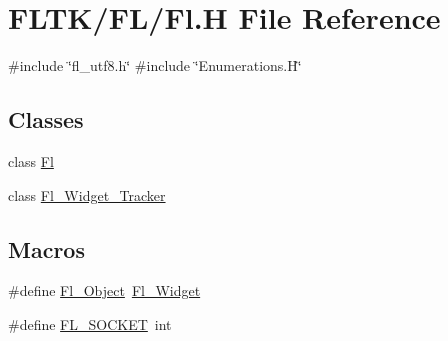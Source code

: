 \hypertarget{_fl_8_h}{}\section{F\+L\+T\+K/\+F\+L/\+Fl.H File Reference}
\label{_fl_8_h}
{\ttfamily \#include \char`\"{}fl\+\_\+utf8.\+h\char`\"{}}\newline
{\ttfamily \#include \char`\"{}Enumerations.\+H\char`\"{}}\newline
\subsection*{Classes}
\begin{DoxyCompactItemize}
\item 
class \hyperlink{class_fl}{Fl}
\item 
class \hyperlink{class_fl___widget___tracker}{Fl\+\_\+\+Widget\+\_\+\+Tracker}
\end{DoxyCompactItemize}
\subsection*{Macros}
\begin{DoxyCompactItemize}
\item 
\#define \hyperlink{_fl_8_h_a659763c4f9798b5b955974b8152b48eb}{Fl\+\_\+\+Object}~\hyperlink{class_fl___widget}{Fl\+\_\+\+Widget}
\item 
\#define \hyperlink{_fl_8_h_a02134b1207d9eb2dce7f6f70e76c199a}{F\+L\+\_\+\+S\+O\+C\+K\+ET}~int
\end{DoxyCompactItemize}
